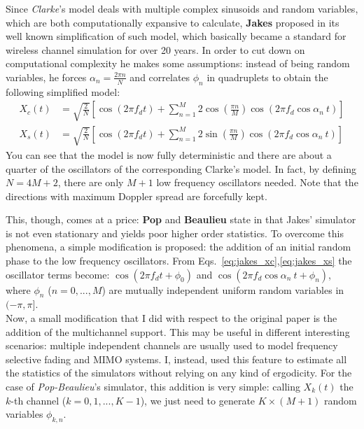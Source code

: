 Since \textit{Clarke}'s model deals with multiple complex sinusoids and random variables, which are both computationally expansive to calculate, \textbf{Jakes} proposed in \cite{jakes} its well known simplification of such model, which basically became a standard for wireless channel simulation for over 20 years. In order to cut down on computational complexity he makes some assumptions: instead of being random variables, he forces $\alpha_n = \frac{2\pi n}{N}$ and correlates $\phi_n$ in quadruplets to obtain the following simplified model:%
%
\begin{subequations}
\begin{align}\label{eq:jakes_xc}
X_c(t) &= \sqrt{\frac{2}{N}} \left[ \cos(2\pi f_d t) + \sum_{n=1}^{M} 2\cos \left( \frac{\pi n}{M} \right) \cos( 2\pi f_d \cos \alpha_n \ t) \right]\\
\label{eq:jakes_xs}
X_s(t) &= \sqrt{\frac{2}{N}} \left[ \cos(2\pi f_d t) + \sum_{n=1}^{M} 2\sin \left( \frac{\pi n}{M} \right) \cos( 2\pi f_d \cos \alpha_n \ t) \right]
\end{align}
\end{subequations}%
%
You can see that the model is now fully deterministic and there are about a quarter of the oscillators of the corresponding Clarke's model. In fact, by defining $N = 4M+2$, there are only $M+1$ low frequency oscillators needed. Note that the directions with maximum Doppler spread are forcefully kept.

This, though, comes at a price: \textbf{Pop} and \textbf{Beaulieu} state in \cite{A1} that Jakes' simulator is not even stationary and yields poor higher order statistics. To overcome this phenomena, a simple modification is proposed: the addition of an initial random phase to the low frequency oscillators. From Eqs.~\ref{eq:jakes_xc},\ref{eq:jakes_xs} the oscillator terms become: $\cos(2\pi f_d t + \phi_0)$ and $\cos( 2\pi f_d \cos \alpha_n \ t + \phi_n)$, where $\phi_n$ ($n=0,...,M$) are mutually independent uniform random variables in $(-\pi,\pi]$.\\
Now, a small modification that I did with respect to the original paper is the addition of the multichannel support. This may be useful in different interesting scenarios: multiple independent channels are usually used to model frequency selective fading and MIMO systems. I, instead, used this feature to estimate all the statistics of the simulators without relying on any kind of ergodicity. For the case of \textit{Pop-Beaulieu}'s simulator, this addition is very simple: calling $X_k(t)$ the $k$-th channel ($k=0,1,...,K-1$), we just need to generate $K \times(M+1)$ random variables $\phi_{k,n}$.

